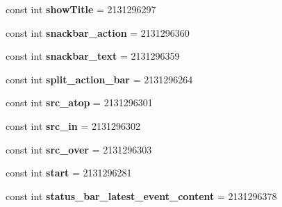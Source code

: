 \begin{DoxyCompactItemize}
\item 
\hypertarget{classClient_1_1Droid_1_1Resource_1_1Id_a7230ca850ee2727d1bf2b3c38f9db333}{}const int {\bfseries show\+Title} = 2131296297\label{classClient_1_1Droid_1_1Resource_1_1Id_a7230ca850ee2727d1bf2b3c38f9db333}

\item 
\hypertarget{classClient_1_1Droid_1_1Resource_1_1Id_ada291b87ea84e2538833fef78cf22c8f}{}const int {\bfseries snackbar\+\_\+action} = 2131296360\label{classClient_1_1Droid_1_1Resource_1_1Id_ada291b87ea84e2538833fef78cf22c8f}

\item 
\hypertarget{classClient_1_1Droid_1_1Resource_1_1Id_af792d9069c56a6d27bcc65cda37b2c92}{}const int {\bfseries snackbar\+\_\+text} = 2131296359\label{classClient_1_1Droid_1_1Resource_1_1Id_af792d9069c56a6d27bcc65cda37b2c92}

\item 
\hypertarget{classClient_1_1Droid_1_1Resource_1_1Id_a5777fd7b835991da58a30a7cff904ab9}{}const int {\bfseries split\+\_\+action\+\_\+bar} = 2131296264\label{classClient_1_1Droid_1_1Resource_1_1Id_a5777fd7b835991da58a30a7cff904ab9}

\item 
\hypertarget{classClient_1_1Droid_1_1Resource_1_1Id_a278abbe5e458e1ad9740b47c43700a25}{}const int {\bfseries src\+\_\+atop} = 2131296301\label{classClient_1_1Droid_1_1Resource_1_1Id_a278abbe5e458e1ad9740b47c43700a25}

\item 
\hypertarget{classClient_1_1Droid_1_1Resource_1_1Id_a1711ab216a00d198d77f503fa82f849f}{}const int {\bfseries src\+\_\+in} = 2131296302\label{classClient_1_1Droid_1_1Resource_1_1Id_a1711ab216a00d198d77f503fa82f849f}

\item 
\hypertarget{classClient_1_1Droid_1_1Resource_1_1Id_af424ccf678e1c26534d929db697e13d8}{}const int {\bfseries src\+\_\+over} = 2131296303\label{classClient_1_1Droid_1_1Resource_1_1Id_af424ccf678e1c26534d929db697e13d8}

\item 
\hypertarget{classClient_1_1Droid_1_1Resource_1_1Id_a1c09e2e78aa52ef38c093ce8351fb36f}{}const int {\bfseries start} = 2131296281\label{classClient_1_1Droid_1_1Resource_1_1Id_a1c09e2e78aa52ef38c093ce8351fb36f}

\item 
\hypertarget{classClient_1_1Droid_1_1Resource_1_1Id_a065609c4703b2087c3d4715f44738438}{}const int {\bfseries status\+\_\+bar\+\_\+latest\+\_\+event\+\_\+content} = 2131296378\label{classClient_1_1Droid_1_1Resource_1_1Id_a065609c4703b2087c3d4715f44738438}


\end{DoxyCompactItemize}
